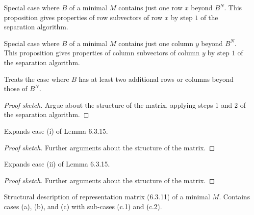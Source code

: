 \begin{proposition}[6.3.13]
  \label{prop:6.3.13}
  Special case where $B$ of a minimal $M$ contains just one row $x$ beyond $B^{N}$. This proposition gives properties of row subvectors of row $x$ by step $1$ of the separation algorithm.
\end{proposition}

\begin{proposition}[6.3.14]
  \label{prop:6.3.14}
  Special case where $B$ of a minimal $M$ contains just one column $y$ beyond $B^{N}$. This proposition gives properties of column subvectors of column $y$ by step $1$ of the separation algorithm.
\end{proposition}

\begin{lemma}[6.3.15]
  \label{lem:6.3.15}
  Treats the case where $B$ has at least two additional rows or columns beyond those of $B^{N}$.
\end{lemma}

\begin{proof}[Proof sketch]
  Argue about the structure of the matrix, applying steps 1 and 2 of the separation algorithm.
\end{proof}

\begin{lemma}[6.3.16]
  \label{lem:6.3.16}
  Expands case (i) of Lemma 6.3.15.
\end{lemma}

\begin{proof}[Proof sketch]
  Further arguments about the structure of the matrix.
\end{proof}

\begin{lemma}[6.3.17]
  \label{lem:6.3.17}
  Expands case (ii) of Lemma 6.3.15.
\end{lemma}

\begin{proof}[Proof sketch]
  Further arguments about the structure of the matrix.
\end{proof}

\begin{theorem}[6.3.18]
  \label{thm:6.3.18}
  Structural description of representation matrix (6.3.11) of a minimal $M$. Contains cases (a), (b), and (c) with sub-cases (c.1) and (c.2).
\end{theorem}

